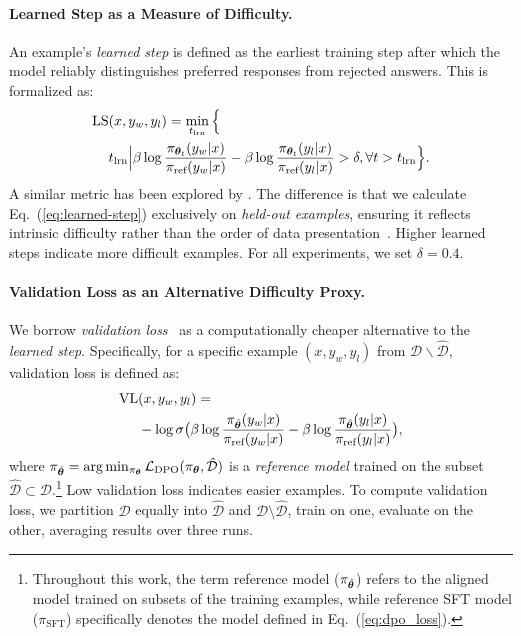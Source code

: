 \paragraph{Learned Step as a Measure of Difficulty.} %
An example's \textit{learned step} is defined as the earliest training step after which the model reliably distinguishes preferred responses from rejected answers. This is formalized as:
\begin{align}
    \label{eq:learned-step}
    \text{LS}&(x, y_w, y_l) = \min_{t_{\text{lrn}}} \Big\{ \\ \nonumber &t_{\text{lrn}} \Big| \beta \log\frac{\pi_{\bm{\theta}_t} (y_w | x)}{\pi_{\text{ref}}(y_w |x)} - \beta \log\frac{\pi_{\bm{\theta}_t}(y_l | x)}{\pi_{\text{ref}}(y_l |x)} > \delta, \forall t > t_{\text{lrn}} \Big\}.
\end{align}
A similar metric has been explored by \citet{wucurricula}. The difference is that we calculate Eq.~(\ref{eq:learned-step}) exclusively on \textit{held-out examples}, ensuring it reflects intrinsic difficulty rather than the order of data presentation~\cite{zhu2024iterative}. 
Higher learned steps indicate more difficult examples. For all experiments, we set $\delta = 0.4$.


\paragraph{Validation Loss as an Alternative Difficulty Proxy.} %
We borrow \textit{validation loss}~\cite{wucurricula,rampp2024does} as a computationally cheaper alternative to the \textit{learned step}. Specifically, for a specific example $(x, y_w, y_l)$ from $\mathcal{D}\backslash \hat{\mathcal{D}}$, validation loss is defined as:
\begin{align}
    \label{eq:validation-loss}
    \text{VL}&(x, y_w, y_l) = \\ \nonumber &- \log \sigma \big(\beta \log\frac{\pi_{\hat{\bm{\theta}}} (y_w | x)}{\pi_{\text{ref}}(y_w |x)} - \beta \log\frac{\pi_{\hat{\bm{\theta}}}(y_l | x)}{\pi_{\text{ref}}(y_l |x)}\big),
\end{align}
where $\pi_{\hat{\bm{\theta}}} = \arg\min_{\pi_{\bm{\theta}}} \mathcal{L}_{\text{DPO}}(\pi_{\bm{\theta}}, \hat{\mathcal{D}})$ is a \textit{reference model} trained on the subset $\hat{\mathcal{D}}\subset \mathcal{D}$.\footnote{Throughout this work, the term reference model ($\pi_{\hat{\bm{\theta}}}$) refers to the aligned model trained on subsets of the training examples, while reference SFT model ($\pi_{\text{SFT}}$) specifically denotes the model defined in Eq.~(\ref{eq:dpo_loss}).}
Low validation loss indicates easier examples. To compute validation loss, we partition $\mathcal{D}$ equally into $\hat{\mathcal{D}}$ and $\mathcal{D}\setminus\hat{\mathcal{D}}$, train on one, evaluate on the other, averaging results over three runs.

